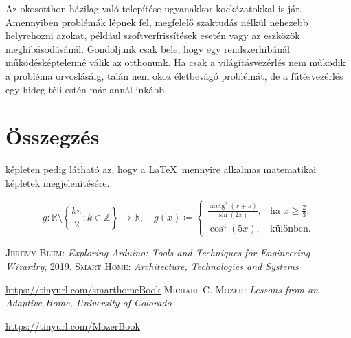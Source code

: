 \documentclass{thesis-ekf}
\theoremstyle{definition}
\DeclareMathOperator{\arctg}{arctg}
\begin{document}
Az okosotthon házilag való telepítése ugyanakkor kockázatokkal is jár. Amennyiben problémák lépnek fel, megfelelő szaktudás nélkül nehezebb helyrehozni azokat, például szoftverfrissítések esetén vagy az eszközök meghibásodásánál. Gondoljunk csak bele, hogy egy rendszerhibánál működésképtelenné válik az otthonunk. Ha csak a világításvezérlés nem működik a probléma orvoslásáig, talán nem okoz életbevágó problémát, de a fűtésvezérlés egy hideg téli estén már annál inkább.


\chapter*{Összegzés}
 \Az{\eqref{matKeplet}} képleten pedig látható az, hogy a \LaTeX~mennyire alkalmas matematikai  képletek megjelenítésére.
 
\begin{equation}\label{matKeplet}
	g\colon \mathbb{R} \setminus \left\{\frac{k\pi}{2}:k\in \mathbb{Z}\right\}\rightarrow \mathbb{R},\quad g(x)\coloneq
	\begin{cases}
		\frac{\arctg^2(x+\pi)}{\sin(2x)},&\text{ha }x\geq\frac{2}{3},\\
		\cos^4(5x), &\text{különben.}
	\end{cases}
\end{equation}



\begin{thebibliography}{2}
\textsc{Jeremy Blum}: \emph{ Exploring Arduino: Tools and Techniques for Engineering Wizardry}, 2019.
\textsc{Smart Home:}\emph{ Architecture, Technologies and Systems}

\url{https://tinyurl.com/smarthomeBook}
\textsc{Michael C. Mozer:} \emph{Lessons from an Adaptive Home, University of Colorado}

\url{ https://tinyurl.com/MozerBook}
\end{thebibliography}
\end{document}
